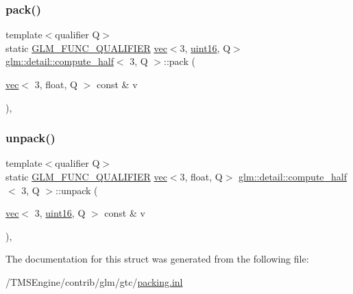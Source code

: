 \subsubsection{\texorpdfstring{pack()}{pack()}}
{\footnotesize\ttfamily template$<$qualifier Q$>$ \\
static \hyperlink{setup_8hpp_a33fdea6f91c5f834105f7415e2a64407}{G\+L\+M\+\_\+\+F\+U\+N\+C\+\_\+\+Q\+U\+A\+L\+I\+F\+I\+ER} \hyperlink{structglm_1_1vec}{vec}$<$3, \hyperlink{namespaceglm_1_1detail_a47b2a7d006d187338e8031a352d1ce56}{uint16}, Q$>$ \hyperlink{structglm_1_1detail_1_1compute__half}{glm\+::detail\+::compute\+\_\+half}$<$ 3, Q $>$\+::pack (\begin{DoxyParamCaption}\item[{\hyperlink{structglm_1_1vec}{vec}$<$ 3, float, Q $>$ const \&}]{v }\end{DoxyParamCaption})\hspace{0.3cm}{\ttfamily [inline]}, {\ttfamily [static]}}

\mbox{\label{structglm_1_1detail_1_1compute__half_3_013_00_01_q_01_4_a888b7245229f861127dedbacf10e1568}} 
\subsubsection{\texorpdfstring{unpack()}{unpack()}}
{\footnotesize\ttfamily template$<$qualifier Q$>$ \\
static \hyperlink{setup_8hpp_a33fdea6f91c5f834105f7415e2a64407}{G\+L\+M\+\_\+\+F\+U\+N\+C\+\_\+\+Q\+U\+A\+L\+I\+F\+I\+ER} \hyperlink{structglm_1_1vec}{vec}$<$3, float, Q$>$ \hyperlink{structglm_1_1detail_1_1compute__half}{glm\+::detail\+::compute\+\_\+half}$<$ 3, Q $>$\+::unpack (\begin{DoxyParamCaption}\item[{\hyperlink{structglm_1_1vec}{vec}$<$ 3, \hyperlink{namespaceglm_1_1detail_a47b2a7d006d187338e8031a352d1ce56}{uint16}, Q $>$ const \&}]{v }\end{DoxyParamCaption})\hspace{0.3cm}{\ttfamily [inline]}, {\ttfamily [static]}}



The documentation for this struct was generated from the following file\+:\begin{DoxyCompactItemize}
\item 
/\+T\+M\+S\+Engine/contrib/glm/gtc/\hyperlink{packing_8inl}{packing.\+inl}\end{DoxyCompactItemize}
